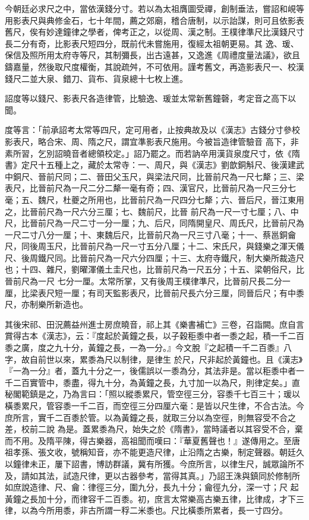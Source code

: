 \begin{pinyinscope}
 今朝廷必求尺之中，當依漢錢分寸。若以為太祖膺圖受禪，創制垂法，嘗詔和峴等用影表尺與典修金石，七十年間，薦之郊廟，稽合唐制，以示詒謀，則可且依影表舊尺，俟有妙達鐘律之學者，俾考正之，以從周、漢之制。王樸律準尺比漢錢尺寸長二分有奇，比影表尺短四分，既前代未嘗施用，復經太祖朝更易。其
 逸、瑗、保信及照所用太府寺等尺，其制彌長，出古遠甚，又逸進《周禮度量法議》，欲且鑄嘉量，然後取尺度權衡，其說疏舛，不可依用。謹考舊文，再造影表尺一、校漢錢尺二並大泉、錯刀、貨布、貨泉總十七枚上進。



 詔度等以錢尺、影表尺各造律管，比驗逸、瑗並太常新舊鐘磬，考定音之高下以聞。



 度等言：「前承詔考太常等四尺，定可用者，止按典故及以《漢志》古錢分寸參校影表尺，略合宋、周、隋之尺，謂宜準影表尺施用。今被旨造律管驗音
 高下，非素所習，乞別詔曉音者總領校定。」詔乃罷之。而若訥卒用漢貨泉度尺寸，依《隋書》定尺十五種上之，藏於太常寺：一、周尺，與《漢志》劉歆銅斛尺、後漢建武中銅尺、晉前尺同；二、晉田父玉尺，與梁法尺同，比晉前尺為一尺七犛；三、梁表尺，比晉前尺為一尺二分二犛一毫有奇；四、漢官尺，比晉前尺為一尺三分七毫；五、魏尺，杜夔之所用也，比晉前尺為一尺四分七犛；六、晉后尺，晉江東用之，比晉前尺為一尺六分三厘；七、魏前尺，比晉
 前尺為一尺一寸七厘；八、中尺，比晉前尺為一尺二寸一分一厘；九、后尺，同隋開皇尺、周氏尺，比晉前尺為一尺二寸八分一厘；十、東魏后尺，比晉前尺為一尺三寸八毫；十一、蔡邕銅龠尺，同後周玉尺，比晉前尺為一尺一寸五分八厘；十二、宋氏尺，與錢樂之渾天儀尺、後周鐵尺同。比晉前尺為一尺六分四厘；十三、太府寺鐵尺，制大樂所裁造尺也；十四、雜尺，劉曜渾儀土圭尺也，比晉前尺為一尺五分；十五、梁朝俗尺，比晉前尺為一尺
 七分一厘。太常所掌，又有後周王樸律準尺，比晉前尺長二分一厘，比梁表尺短一厘；有司天監影表尺，比晉前尺長六分三厘，同晉后尺；有中黍尺，亦制樂所新造也。



 其後宋祁、田況薦益州進士房庶曉音，祁上其《樂書補亡》三卷，召詣闕。庶自言賞得古本《漢志》，云：『度起於黃鐘之長，以子穀秬黍中者一黍之起，積一千二百黍之廣，度之九十分，黃鐘之長，一為一分。』今文脫『之起積一千二百黍』八字，故自前世以來，累黍為尺以制律，是律生
 於尺，尺非起於黃鐘也。且《漢志》『一為一分』者，蓋九十分之一，後儒誤以一黍為分，其法非是。當以秬黍中者一千二百實管中，黍盡，得九十分，為黃鐘之長，九寸加一以為尺，則律定矣。」直秘閣範鎮是之，乃為言曰：「照以縱黍累尺，管空徑三分，容黍千七百三十；瑗以橫黍累尺，管容黍一千二百，而空徑三分四厘六毫：是皆以尺生律，不合古法。今庶所言，實千二百黍於管。以為黃鐘之長，就取三分以為空徑，則無容受不合之差，校前二說
 為是。蓋累黍為尺，始失之於《隋書》，當時議者以其容受不合，棄而不用。及隋平陳，得古樂器，高祖聞而嘆曰：『華夏舊聲也！』遂傳用之。至唐祖孝孫、張文收，號稱知音，亦不能更造尺律，止沿隋之古樂，制定聲器。朝廷久以鐘律未正，屢下詔書，博訪群議，冀有所獲。今庶所言，以律生尺，誠眾論所不及，請如其法，試造尺律，更以古器參考，當得其真。」乃詔王洙與鎮同於修制所如庶說造律、尺、龠：律徑三分，圍九分，長九十分；龠徑九分，深一寸；尺
 起黃鐘之長加十分，而律容千二百黍。初，庶言太常樂高古樂五律，比律成，才下三律，以為今所用黍，非古所謂一稃二米黍也。尺比橫黍所累者，長一寸四分。




\end{pinyinscope}

